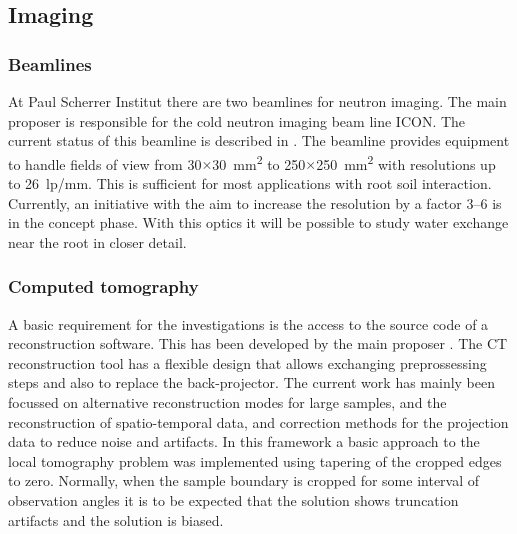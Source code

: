 \documentclass[a4paper,11pt]{scrreprt}
\begin{document}
\subsection{Imaging}
\subsubsection{Beamlines}
At Paul Scherrer Institut there are two beamlines for neutron imaging. The main
proposer is responsible for the cold neutron imaging beam line ICON. The current
status of this beamline is described in \cite{kaestner2011_ICON}. The beamline provides equipment 
to handle fields of view from 30$\times$30~mm\textsuperscript{2} to 250$\times$250~mm\textsuperscript{2} 
with resolutions up to 26~lp/mm. This is sufficient for most applications with root soil interaction. 
Currently, an initiative with the aim to increase the resolution by a factor 3--6 is in the concept phase.
With this optics it will be possible to study water exchange near the root in closer detail. 

\subsubsection{Computed tomography}
A basic requirement for the investigations is the access to the source code of a
reconstruction software. This has been developed by the main proposer \cite{kaestner2011_muhrec}. 
The CT reconstruction tool has a flexible design that allows exchanging preprossessing 
steps and also to replace the back-projector. The current work has mainly been focussed 
on alternative reconstruction modes for large samples, and the reconstruction of 
spatio-temporal data, and correction methods for the projection data to reduce noise 
and artifacts. In this framework a basic approach to the local tomography problem was 
implemented using tapering of the cropped edges to zero. Normally, when the sample boundary 
is cropped for some interval of observation angles it is to be expected that the
solution shows truncation artifacts and the solution is biased. 
\end{document}
